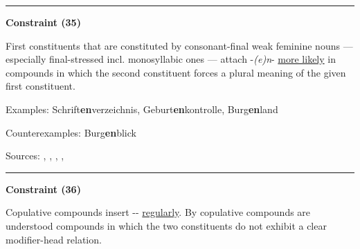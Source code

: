 \hrule




\vspace{0.4em}

\begin{center}
\textbf{Constraint (35)}
\end{center}

\noindent
First constituents that are constituted by consonant-final weak feminine nouns --- especially final-stressed incl. monosyllabic ones --- attach -\textit{(e)n}- \underline{more likely} in compounds in which the second constituent forces a plural meaning of the given first constituent.
\vspace{0.35em}


\vspace{0.3em}

\noindent
Examples: Schrift\textbf{en}verzeichnis, Geburt\textbf{en}kontrolle, Burg\textbf{en}land

\noindent
Counterexamples: Burg\textbf{en}blick

\vspace{0.3em}

\noindent
Sources: \citet[229]{eisenberg_2013}, \citet[3]{nuebling_szczepaniak_2008}, \citet[80]{nuebling_szczepaniak_2013}, \citet[110]{ortner_mueller-bollhagen_1991}, \citet[29]{schaefer_2018}


\hrule




\vspace{0.4em}

\begin{center}
\textbf{Constraint (36)}
\end{center}

\noindent
Copulative compounds insert \mbox{-{\zeroLinker}-} \underline{regularly}. By copulative compounds are understood compounds in which the two constituents do not exhibit a clear modifier-head relation.
\vspace{0.35em}

